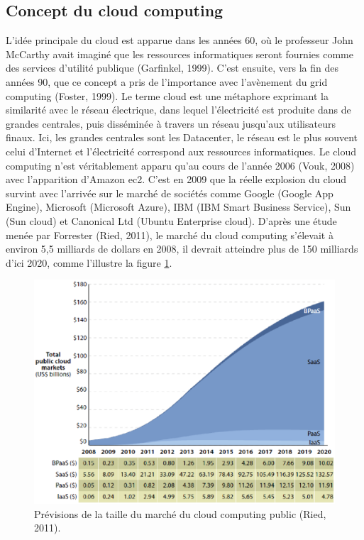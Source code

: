     \subsection{Concept du cloud computing}
  L'idée principale du cloud est apparue dans les années 60, où le professeur John McCarthy avait imaginé que les ressources informatiques seront fournies comme des services d’utilité publique (Garfinkel, 1999). C'est ensuite, vers la fin des années 90, que ce concept a pris de l'importance avec l’avènement du grid computing  (Foster, 1999). Le terme cloud est une métaphore exprimant la similarité avec le réseau électrique, dans lequel l'électricité est produite dans de grandes centrales, puis disséminée à travers un réseau jusqu'aux utilisateurs finaux. Ici, les grandes centrales sont les Datacenter, le réseau est le plus souvent celui d'Internet et l'électricité correspond aux ressources informatiques. Le cloud computing  n'est véritablement apparu qu'au cours de l’année 2006 (Vouk, 2008) avec l'apparition d'Amazon \ac{ec2}. C'est en 2009 que la réelle explosion du cloud survint avec l'arrivée sur le marché de sociétés comme Google (Google App Engine), Microsoft (Microsoft Azure), IBM (IBM Smart Business Service), Sun (Sun cloud) et Canonical Ltd (Ubuntu Enterprise cloud). D'après une étude menée par Forrester (Ried, 2011), le marché du cloud computing  s'élevait à environ 5,5 milliards de dollars en 2008, il devrait atteindre plus de 150 milliards d'ici 2020, comme l’illustre la figure \ref{fig:tempsnip4}. 
    
    \begin{figure}[h]
    	\centering
    	\includegraphics[width=0.8\linewidth]{images/tempsnip4}
    	\caption{Prévisions de la taille du marché du cloud computing  public (Ried, 2011).}
    	\label{fig:tempsnip4}
    \end{figure}
